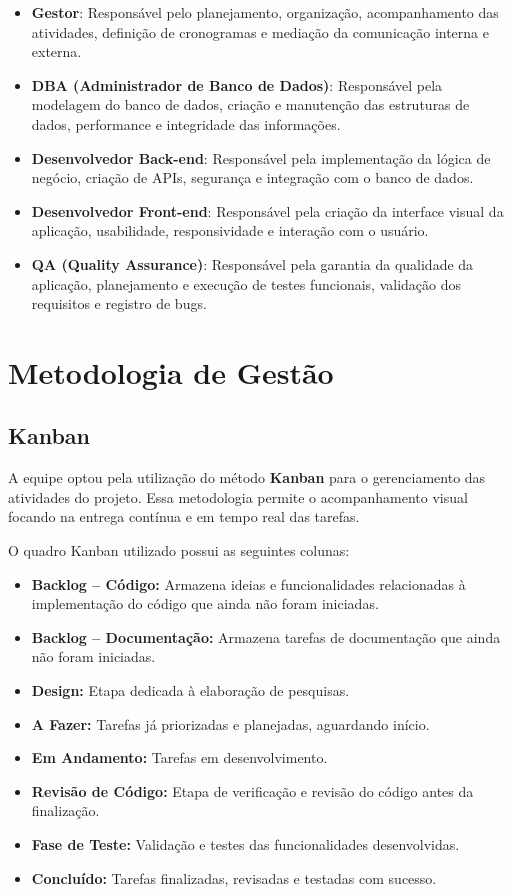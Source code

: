 \documentclass[
	12pt,				%
	openany,			%
	twoside,			%
	a4paper,			%
	english,			%
	brazil				%
	]{abntex2}
\begin{document}
\begin{itemize}
    \item \textbf{Gestor}: Responsável pelo planejamento, organização, acompanhamento das atividades, definição de cronogramas e mediação da comunicação interna e externa.
    \item \textbf{DBA (Administrador de Banco de Dados)}: Responsável pela modelagem do banco de dados, criação e manutenção das estruturas de dados, performance e integridade das informações.
    \item \textbf{Desenvolvedor Back-end}: Responsável pela implementação da lógica de negócio, criação de APIs, segurança e integração com o banco de dados.
    \item \textbf{Desenvolvedor Front-end}: Responsável pela criação da interface visual da aplicação, usabilidade, responsividade e interação com o usuário.
    \item \textbf{QA (Quality Assurance)}: Responsável pela garantia da qualidade da aplicação, planejamento e execução de testes funcionais, validação dos requisitos e registro de bugs.
\end{itemize}

\section{Metodologia de Gestão}

\subsection{Kanban}

A equipe optou pela utilização do método \textbf{Kanban} para o gerenciamento das atividades do projeto. Essa metodologia permite o acompanhamento visual focando na entrega contínua e em tempo real das tarefas.

O quadro Kanban utilizado possui as seguintes colunas:

\begin{itemize}
    \item \textbf{Backlog – Código:} Armazena ideias e funcionalidades relacionadas à implementação do código que ainda não foram iniciadas.
    \item \textbf{Backlog – Documentação:} Armazena tarefas de documentação que ainda não foram iniciadas.
    \item \textbf{Design:} Etapa dedicada à elaboração de pesquisas.
    \item \textbf{A Fazer:} Tarefas já priorizadas e planejadas, aguardando início.
    \item \textbf{Em Andamento:} Tarefas em desenvolvimento.
    \item \textbf{Revisão de Código:} Etapa de verificação e revisão do código antes da finalização.
    \item \textbf{Fase de Teste:} Validação e testes das funcionalidades desenvolvidas.
    \item \textbf{Concluído:} Tarefas finalizadas, revisadas e testadas com sucesso.
\end{itemize}
\end{document}
